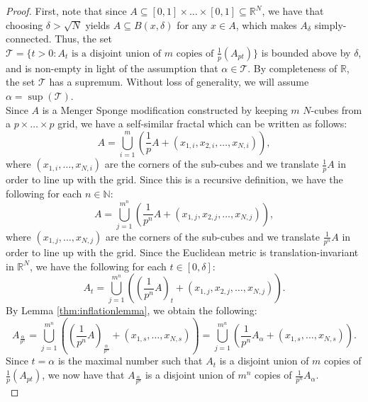 \documentclass[10pt,a4paper]{amsart}
\begin{document}
\begin{proof}
First, note that since $A \subseteq [0,1]\times\dots\times[0,1] \subseteq \mathbb{R}^N$, we have that choosing $\delta > \sqrt{N}$ yields $A \subseteq B(x,\delta)$ for any $x \in A$, which makes $A_{\delta}$ simply-connected. Thus, the set $\mathscr{T} = \{t > 0 : A_t \text{ is a disjoint union of $m$ copies of $\frac{1}{p} \left(A_{pt}\right)$}\}$ is bounded above by $\delta$, and is non-empty in light of the assumption that $\alpha \in \mathscr{T}$. By completeness of $\mathbb{R}$, the set $\mathscr{T}$ has a supremum. Without loss of generality, we will assume $\alpha = \sup(\mathscr{T})$. \\

Since $A$ is a Menger Sponge modification constructed by keeping $m$ $N$-cubes from a $p\times\dots\times p$ grid, we have a self-similar fractal which can be written as follows:
\begin{equation}
A = \bigcup_{i=1}^m \left(\frac{1}{p} A + (x_{1,i},x_{2,i},\dots,x_{N,i})\right),
\end{equation}
where $(x_{1,i},\dots,x_{N,i})$ are the corners of the sub-cubes and we translate $\frac{1}{p} A$ in order to line up with the grid. Since this is a recursive definition, we have the following for each $n \in \mathbb{N}$:
\begin{equation}
A = \bigcup_{j=1}^{m^n} \left(\frac{1}{p^n} A + (x_{1,j},x_{2,j},\dots,x_{N,j})\right),
\end{equation}
where $(x_{1,j},\dots,x_{N,j})$ are the corners of the sub-cubes and we translate $\frac{1}{p^n} A$ in order to line up with the grid. Since the Euclidean metric is translation-invariant in $\mathbb{R}^N$, we have the following for each $t \in [0,\delta]$:
\begin{equation} \label{eq:selfsimilardefnd}
A_t = \bigcup_{j=1}^{m^n} \left(\left(\frac{1}{p^n} A\right)_t + (x_{1,j},x_{2,j},\dots,x_{N,j})\right).
\end{equation}
By Lemma \ref{thm:inflationlemma}, we obtain the following:
\begin{equation}
A_{\frac{\alpha}{p^n}} = \bigcup_{j=1}^{m^n} \left(\left(\frac{1}{p^n} A\right)_{\frac{\alpha}{p^n}} + (x_{1,s},\dots,x_{N,s})\right)
= \bigcup_{j=1}^{m^n} \left(\frac{1}{p^n} A_{\alpha} + (x_{1,s},\dots,x_{N,s})\right).
\end{equation}
Since $t = \alpha$ is the maximal number such that $A_t$ is a disjoint union of $m$ copies of $\frac{1}{p} \left(A_{pt}\right)$, we now have that $A_{\frac{\alpha}{p^n}}$ is a disjoint union of $m^n$ copies of $\frac{1}{p^n} A_{\alpha}$. \\


\end{proof}
\end{document}
